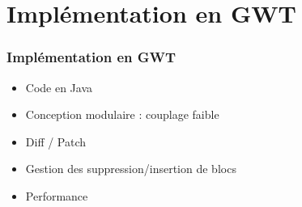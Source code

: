 \section{Implémentation en GWT}
  \begin{frame}
    \frametitle{Implémentation en GWT}
    \begin{itemize}
      \item<1-> Code en Java
      \item<2-> Conception modulaire : couplage faible
      \item<3-> Diff / Patch
      \item<4-> Gestion des suppression/insertion de blocs
      \item<5-> Performance
    \end{itemize}
  \end{frame}

